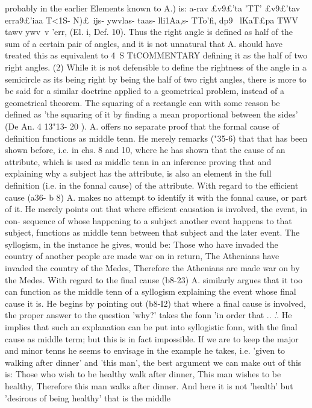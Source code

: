 {{{{{{{{{{{{{{{{{{{{{{{{{{{{{{{{{{{{{{{{{{{{{{{{{{{{{{{{probably in the earlier Elements known to A.) is: a-rav £v9£'ta 'TT'
£v9£'tav erra9£'iaa T<1S- N)£~ijs- ywvlas- taas- lli1}Aa,s- TTo'fi, dp9~ lKaT£pa
TWV tawv ywv~v 'err, (El. i, Def. 10). Thus the right angle is
defined as half of the sum of a certain pair of angles, and it is not
unnatural that A. should have treated this as equivalent to
4~S
TtCOMMENTARY
defining it as the half of two right angles. (2) While it is not
defensible to define the rightness of the angle in a semicircle as
its being right by being the half of two right angles, there is
more to be said for a similar doctrine applied to a geometrical
problem, instead of a geometrical theorem. The squaring of a
rectangle can with some reason be defined as 'the squaring of it
by finding a mean proportional between the sides' (De An.
4 13"13- 20 ).
A. offers no separate proof that the formal cause of definition
functions as middle tenn. He merely remarks ("35-6) that that
has been shown before, i.e. in chs. 8 and 10, where he has shown
that the cause of an attribute, which is used as middle tenn in
an inference proving that and explaining why a subject has the
attribute, is also an element in the full definition (i.e. in the fonnal
cause) of the attribute.
With regard to the efficient cause (a36- b 8) A. makes no attempt
to identify it with the fonnal cause, or part of it. He merely points
out that where efficient causation is involved, the event, in con-
sequence of whose happening to a subject another event happens
to that subject, functions as middle tenn between that subject
and the later event. The syllogism, in the instance he gives,
would be: Those who have invaded the country of another people
are made war on in return, The Athenians have invaded the
country of the Medes, Therefore the Athenians are made war on
by the Medes.
With regard to the final cause (b8-23) A. similarly argues that
it too can function as the middle tenn of a syllogism explaining
the event whose final cause it is. He begins by pointing out
(b8-I2) that where a final cause is involved, the proper answer
to the question 'why?' takes the fonn 'in order that .. .'. He
implies that such an explanation can be put into syllogistic fonn,
with the final cause as middle term; but this is in fact impossible.
If we are to keep the major and minor tenns he seems to envisage
in the example he takes, i.e. 'given to walking after dinner' and
'this man', the best argument we can make out of this is: Those
who wish to be healthy walk after dinner, This man wishes to be
healthy, Therefore this man walks after dinner. And here it is
not 'health' but 'desirous of being healthy' that is the middle
}}}}}}}}}}}}}}}}}}}}}}}}}}}}}}}}}}}}}}}}}}}}}}}}}}}}}}}

